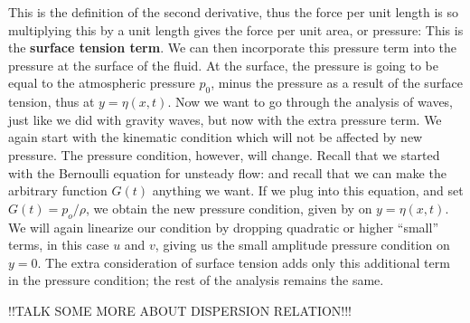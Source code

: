 \documentclass[12pt]{book}
\begin{document}
This is the definition of the second derivative, thus the force per unit length is
so multiplying this by a unit length gives the force per unit area, or pressure:
This is the \textbf{surface tension term}.  %
We can then incorporate this pressure term into the pressure at the surface of the fluid.  At the surface, the pressure is going to be equal to the atmospheric pressure $p_0$, minus the pressure as a result of the surface tension, thus
at $y=\eta(x,t)$.  Now we want to go through the analysis of waves, just like we did with gravity waves, but now with the extra pressure term.  We again start with the kinematic condition
which will not be affected by new pressure.  The pressure condition,
however, will change.  Recall that we started with the Bernoulli equation for unsteady flow:
 and recall that we can make the arbitrary function $G(t)$ anything we want.  If we plug   into this equation, and set $G(t) = p_o/\rho$, we obtain the new pressure condition, given by
on $y=\eta(x,t)$.  We will again linearize our condition by dropping quadratic or higher ``small'' terms, in this case $u$ and $v$, giving us the small amplitude pressure condition
on $y=0$.  The extra consideration of surface tension adds only this additional term in the pressure condition; the rest of the analysis remains the same.


!!TALK SOME MORE ABOUT DISPERSION RELATION!!! %
\end{document}
